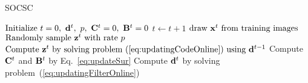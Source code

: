 \begin{algorithm}[H]
\caption{SOCSC} \label{algo:SOCSC}
\begin{algorithmic}[1]
\State $\text{Initialize} ~ t=0, ~\filter^t, ~p, ~\surC^t = 0, ~\surB^t = 0$
    \State $t \gets t+1$
    \State $ \text{draw } \signal^t \text{ from training images} $
    \State $ \text{Randomly sample }\code^t \text{ with rate } p $
    \State $ \text{Compute } \code^t \text{ by solving problem~(\ref{eq:updatingCodeOnline}) using } \filter^{t-1}$
    \State Compute $\surC^t$ and $\surB^t$ by Eq.~\ref{eq:updateSur}
    \State Compute $\filter^t$ by solving problem~(\ref{eq:updatingFilterOnline})
\EndWhile
\end{algorithmic}
\end{algorithm}

